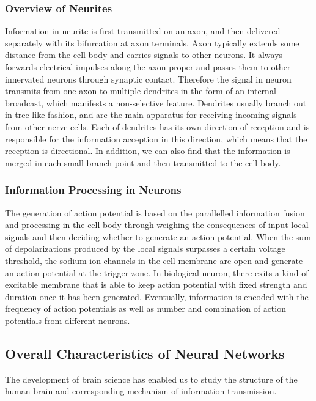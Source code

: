 \documentclass[journal,comsoc]{IEEEtran}
\begin{document}
			\subsubsection{Overview of Neurites}
				Information in neurite is first transmitted on an axon, and then delivered separately with its bifurcation at axon terminals. 
				Axon typically extends some distance from the cell body and carries signals to other neurons.
				It always forwards electrical impulses along the axon proper and passes them to other innervated neurons through synaptic contact. 
				Therefore the signal in neuron transmits from one axon to multiple dendrites in the form of an internal broadcast, which manifests a non-selective feature.
				Dendrites usually branch out in tree-like fashion, and are the main apparatus for receiving incoming signals from other nerve cells. 
				Each of dendrites has its own direction of reception and is responsible for the information acception in this direction, which means that the reception is directional. 
				In addition, we can also find that the information is merged in each small branch point and then transmitted to the cell body.			
			
			\subsubsection{Information Processing in Neurons}
				The generation of action potential is based on the parallelled information fusion and processing in the cell body through weighing the consequences of input local signals and then deciding whether to generate an action potential. 
				When the sum of depolarizations produced by the local signals surpasses a certain voltage threshold, the sodium ion channels in the cell membrane are open and generate an action potential at the trigger zone. 
				In biological neuron, there exits a kind of excitable membrane that is able to keep action potential with fixed strength and duration once it has been generated.
				Eventually, information is encoded with the frequency of action potentials as well as number and combination of action potentials from different neurons\cite{bear2007neuroscience}. 
				
		\subsection{Overall Characteristics of Neural Networks}
			The development of brain science has enabled us to study the structure of the human brain and corresponding mechanism of information transmission.
			
\end{document}
